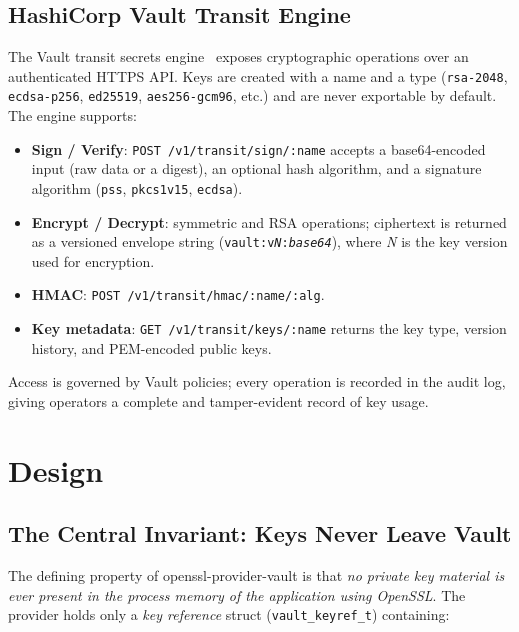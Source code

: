 \documentclass[sigconf,10pt]{acmart}
\begin{document}
\subsection{HashiCorp Vault Transit Engine}

The Vault transit secrets engine~\cite{vault-transit} exposes cryptographic
operations over an authenticated HTTPS API.  Keys are created with a name
and a type (\texttt{rsa-2048}, \texttt{ecdsa-p256}, \texttt{ed25519},
\texttt{aes256-gcm96}, etc.) and are never exportable by default.  The
engine supports:

\begin{itemize}
  \item \textbf{Sign / Verify}: \texttt{POST /v1/transit/sign/:name} accepts a
        base64-encoded input (raw data or a digest), an optional hash algorithm,
        and a signature algorithm (\texttt{pss}, \texttt{pkcs1v15},
        \texttt{ecdsa}).
  \item \textbf{Encrypt / Decrypt}: symmetric and RSA operations;
        ciphertext is returned as a versioned envelope string
        (\texttt{vault:v\emph{N}:\emph{base64}}), where \emph{N} is the key
        version used for encryption.
  \item \textbf{HMAC}: \texttt{POST /v1/transit/hmac/:name/:alg}.
  \item \textbf{Key metadata}: \texttt{GET /v1/transit/keys/:name} returns
        the key type, version history, and PEM-encoded public keys.
\end{itemize}

Access is governed by Vault policies; every operation is recorded in the
audit log, giving operators a complete and tamper-evident record of key
usage.

\section{Design}
\label{sec:design}

\subsection{The Central Invariant: Keys Never Leave Vault}

The defining property of openssl-provider-vault is that \emph{no private key
material is ever present in the process memory of the application using
OpenSSL}.  The provider holds only a \emph{key reference} struct
(\texttt{vault\_keyref\_t}) containing:
\end{document}
